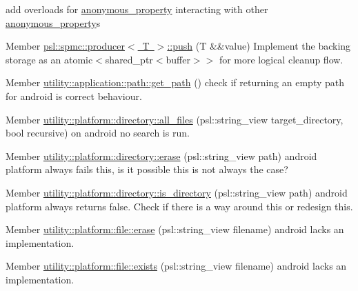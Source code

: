 \begin{DoxyRefList}
%
add overloads for \mbox{\hyperlink{classpsl_1_1serialization_1_1details_1_1anonymous__property}{anonymous\+\_\+property}} interacting with other \mbox{\hyperlink{classpsl_1_1serialization_1_1details_1_1anonymous__property}{anonymous\+\_\+property}}\textquotesingle{}s  
\item[Member \mbox{\hyperlink{classpsl_1_1spmc_1_1producer_a11cdadc6ac76979d33eee5cb7f7284f3}{psl::spmc::producer$<$ T $>$::push}} (T \&\&value)]\label{todo__todo000011}%
%
Implement the backing storage as an atomic$<$shared\+\_\+ptr$<$buffer$>$$>$ for more logical cleanup flow.  
\item[Member \mbox{\hyperlink{namespaceutility_1_1application_1_1path_a4e9a3a1197bb19854671a376eae0d648}{utility::application::path::get\+\_\+path}} ()]\label{todo__todo000010}%
%
check if returning an empty path for android is correct behaviour.  
\item[Member \mbox{\hyperlink{classutility_1_1platform_1_1directory_a7c46f9c700311a3e35a5051b4b490d34}{utility::platform::directory::all\+\_\+files}} (psl\+::string\+\_\+view target\+\_\+directory, bool recursive)]\label{todo__todo000014}%
%
on android no search is run.  
\item[Member \mbox{\hyperlink{classutility_1_1platform_1_1directory_a4461e834aff50accc70d32afdc07edda}{utility::platform::directory::erase}} (psl\+::string\+\_\+view path)]\label{todo__todo000013}%
%
android platform always fails this, is it possible this is not always the case?  
\item[Member \mbox{\hyperlink{classutility_1_1platform_1_1directory_a6ee485a49093a2f072d63901d130fbe5}{utility::platform::directory::is\+\_\+directory}} (psl\+::string\+\_\+view path)]\label{todo__todo000012}%
%
android platform always returns false. Check if there is a way around this or redesign this.  
\item[Member \mbox{\hyperlink{namespaceutility_1_1platform_1_1file_a5f0b946c4c9580a4c4871488de4945db}{utility::platform::file::erase}} (psl\+::string\+\_\+view filename)]\label{todo__todo000016}%
%
android lacks an implementation.  
\item[Member \mbox{\hyperlink{namespaceutility_1_1platform_1_1file_ae1b9987030fbc4be85c4832f69b5f16f}{utility::platform::file::exists}} (psl\+::string\+\_\+view filename)]\label{todo__todo000015}%
%
android lacks an implementation. 
\end{DoxyRefList}